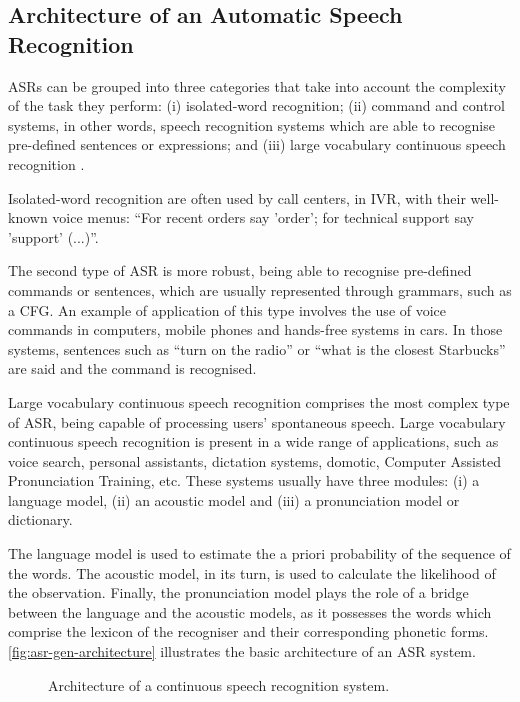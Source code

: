 \subsection{Architecture of an Automatic Speech Recognition}

\ac{ASR}s can be grouped into three categories that take into account the complexity of the task they perform: (i) isolated-word recognition; (ii) command and control systems, in other words, speech recognition systems which are able to recognise pre-defined sentences or expressions; and (iii) large vocabulary continuous speech recognition \cite{Rabiner1997}.

Isolated-word recognition are often used by call centers, in \ac{IVR}, with their well-known voice menus: ``For recent orders say 'order'; for technical support say 'support' (...)''. 

The second type of \ac{ASR} is more robust, being able to recognise pre-defined commands or sentences, which are usually represented through grammars, such as a \ac{CFG}. An example of application of this type involves the use of voice commands in computers, mobile phones and hands-free systems in cars. In those systems, sentences such as ``turn on the radio'' or ``what is the closest Starbucks'' are said and the command is recognised. 

Large vocabulary continuous speech recognition comprises the most complex type of ASR, being capable of processing users' spontaneous speech.
Large vocabulary continuous speech recognition is present in a wide range of applications, such as voice search, personal assistants, dictation systems, domotic, Computer Assisted Pronunciation Training, etc. These systems usually have three modules: (i) a language model, (ii) an acoustic model and (iii) a pronunciation model or dictionary.

The language model is used to estimate the a priori probability of the sequence of the words. The acoustic model, in its turn, is used to calculate the likelihood of the observation. Finally, the pronunciation model plays the role of a bridge between the language and the acoustic models, as it possesses the words which comprise the lexicon of the recogniser and their corresponding phonetic forms. \autoref{fig:asr-gen-architecture} illustrates the basic architecture of an ASR system.

\begin{figure}[!ht]
        \noindent{}
        \caption{Architecture of a continuous speech recognition system.}
        \label{fig:asr-gen-architecture}
\end{figure}

